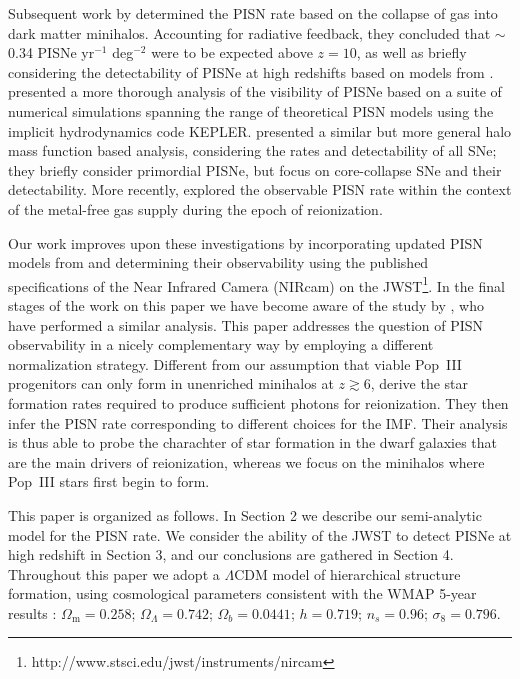\documentclass{thesis}
\begin{document}
Subsequent work by \citet{WiseAbel2005} determined the PISN rate based
on the collapse of gas into dark matter minihalos. Accounting for
radiative feedback, they concluded that $\sim$0.34 PISNe yr$^{-1}$
deg$^{-2}$ were to be expected above $z=10$, as well as briefly
considering the detectability of PISNe at high redshifts based on
models from \citet{HegerWoosley2002}.  \citet{Scannapiecoetal2005}
presented a more thorough analysis of the visibility of PISNe based
on a suite of numerical simulations spanning the range of theoretical
PISN models using the implicit hydrodynamics code
KEPLER. \citet{MesingerJohnsonHaiman2006} presented a similar but more
general halo mass function based analysis, considering the rates and
detectability of all SNe; they briefly consider primordial PISNe, but
focus on core-collapse SNe and their detectability.  More recently,
\citet{TrentiStiavelliShull2009} explored the observable PISN rate
within the context of the metal-free gas supply during the epoch of
reionization.

Our work improves upon these investigations by incorporating updated
PISN models from \citet{KasenWoosleyHeger2011} and determining their
observability using the published specifications of the Near Infrared
Camera (NIRcam) on the
JWST\footnote{http://www.stsci.edu/jwst/instruments/nircam}.
In the final stages of the work on this paper we have become aware of
the study by \citet{PanKasenLoeb2012}, who have performed a similar
analysis. This paper addresses the question of PISN observability in a
nicely complementary way by employing a different normalization
strategy. Different from our assumption that viable Pop~III
progenitors can only form in unenriched minihalos at $z\gtrsim6$,
\citet{PanKasenLoeb2012} derive the star formation rates required to
produce sufficient photons for reionization.  They then infer the PISN
rate corresponding to different choices for the IMF.  Their analysis
is thus able to probe the charachter of star formation in the dwarf
galaxies that are the main drivers of reionization, whereas we focus
on the minihalos where Pop~III stars first begin to form.

This paper is organized as follows.  In Section 2 we describe our
semi-analytic model for the PISN rate.  We consider the ability of the
JWST to detect PISNe at high redshift in Section 3, and our
conclusions are gathered in Section 4.  Throughout this paper we adopt
a $\Lambda$CDM model of hierarchical structure formation, using
cosmological parameters consistent with the WMAP 5-year results
\citep{Komatsu2009}: $\Omega_{\mathrm m} = 0.258$; $\Omega_{\Lambda}=0.742$;
$\Omega_b=0.0441$; $h=0.719$; $n_s=0.96$; $\sigma_8=0.796$.
\end{document}
